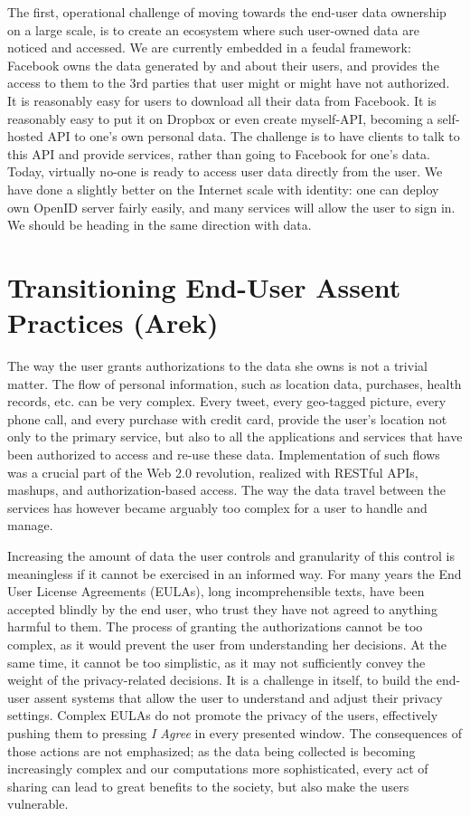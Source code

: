 The first, operational challenge of moving towards the end-user data ownership on a large scale, is to create an ecosystem where such user-owned data are noticed and accessed.
We are currently embedded in a feudal framework: Facebook owns the data generated by and about their users, and provides the access to them to the 3rd parties that user might or might have not authorized.
It is reasonably easy for users to download all their data from Facebook.
It is reasonably easy to put it on Dropbox or even create myself-API, becoming a self-hosted API to one's own personal data.
The challenge is to have clients to talk to this API and provide services, rather than going to Facebook for one's data.
Today, virtually no-one is ready to access user data directly from the user.
We have done a slightly better on the Internet scale with identity: one can deploy own OpenID server fairly easily, and many services will allow the user to sign in.
We should be heading in the same direction with data.

\section{Transitioning End-User Assent Practices (Arek)}

The way the user grants authorizations to the data she owns is not a trivial matter.
The flow of personal information, such as location data, purchases, health records, etc. can be very complex.
Every tweet, every geo-tagged picture, every phone call, and every purchase with credit card, provide the user's location not only to the primary service, but also to all the applications and services that have been authorized to access and re-use these data.
Implementation of such flows was a crucial part of the Web 2.0 revolution, realized with RESTful APIs, mashups, and authorization-based access.
The way the data travel between the services has however became arguably too complex for a user to handle and manage.

Increasing the amount of data the user controls and granularity of this control is meaningless if it cannot be exercised in an informed way.
For many years the End User License Agreements (EULAs), long incomprehensible texts, have been accepted blindly by the end user, who trust they have not agreed to anything harmful to them.
The process of granting the authorizations cannot be too complex, as it would prevent the user from understanding her decisions.
At the same time, it cannot be too simplistic, as it may not sufficiently convey the weight of the privacy-related decisions.
It is a challenge in itself, to build the end-user assent systems that allow the user to understand and adjust their privacy settings.
Complex EULAs do not promote the privacy of the users, effectively pushing them to pressing \emph{I Agree} in every presented window.
The consequences of those actions are not emphasized; as the data being collected is becoming increasingly complex and our computations more sophisticated, every act of sharing can lead to great benefits to the society, but also make the users vulnerable.

